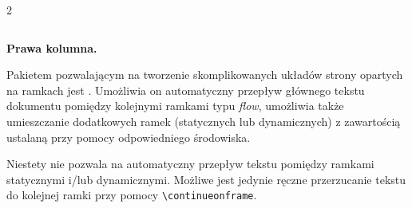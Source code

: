 \documentclass[fontSize=10pt,extra]{pdfArticle}
\begin{document}
\begin{paracol}{3}
\begin{nthcolumn}{0}
\begin{CatchExample}
\begin{tcolorbox}[breakable]%
\begin{parcolumns}[
	distance=0.1\textwidth,
	colwidths={1=.45\textwidth, 2=.45\textwidth}
]{2}
  \colchunk[2]{
    \lipsum[1][1-13]
  }
\end{parcolumns}
\end{tcolorbox}
\end{CatchExample}

\putExampleTeX

\begin{adjustwidth}{.05\textwidth}{.05\textwidth}
	\setlength{\hsize}{\hsize-.05\textwidth}
	\inputminted[breakaftersymbolpost={},numbers=left,numbersep=4pt,fontsize=\footnotesize]{latex}{\jobname.0.tmp}
\end{adjustwidth}

\end{nthcolumn}
\begin{nthcolumn}{2}
\textbf{Prawa kolumna.}

\lipsum[1-3]

\end{nthcolumn}
\end{paracol}

Pakietem pozwalającym na tworzenie skomplikowanych układów strony opartych na ramkach jest .
Umożliwia on automatyczny przepływ głównego tekstu dokumentu pomiędzy kolejnymi ramkami typu \emph{flow},
umożliwia także umieszczanie dodatkowych ramek (statycznych lub dynamicznych) z zawartością ustalaną przy pomocy odpowiedniego środowiska.

Niestety nie pozwala na automatyczny przepływ tekstu pomiędzy ramkami statycznymi i/lub dynamicznymi. Możliwe jest jedynie ręczne przerzucanie tekstu do kolejnej ramki przy pomocy \Verb$\continueonframe$.
\end{document}
